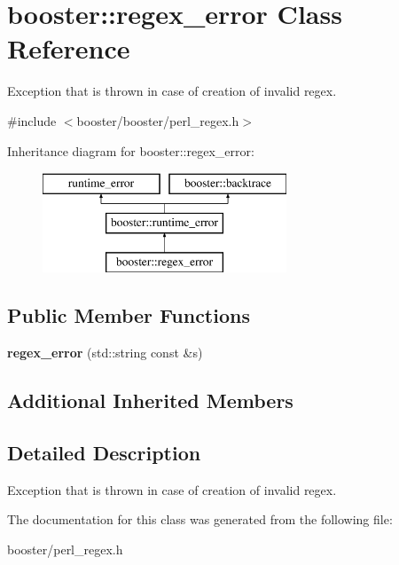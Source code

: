 \section{booster\+:\+:regex\+\_\+error Class Reference}
\label{classbooster_1_1regex__error}


Exception that is thrown in case of creation of invalid regex.  




{\ttfamily \#include $<$booster/booster/perl\+\_\+regex.\+h$>$}

Inheritance diagram for booster\+:\+:regex\+\_\+error\+:\begin{figure}[H]
\begin{center}
\leavevmode
\includegraphics[height=3.000000cm]{classbooster_1_1regex__error}
\end{center}
\end{figure}
\subsection*{Public Member Functions}
\begin{DoxyCompactItemize}
\item 
{\bfseries regex\+\_\+error} (std\+::string const \&s)\label{classbooster_1_1regex__error_ab47c1b94a4b23450d0d349c9fcdc62fc}

\end{DoxyCompactItemize}
\subsection*{Additional Inherited Members}


\subsection{Detailed Description}
Exception that is thrown in case of creation of invalid regex. 

The documentation for this class was generated from the following file\+:\begin{DoxyCompactItemize}
\item 
booster/perl\+\_\+regex.\+h\end{DoxyCompactItemize}
